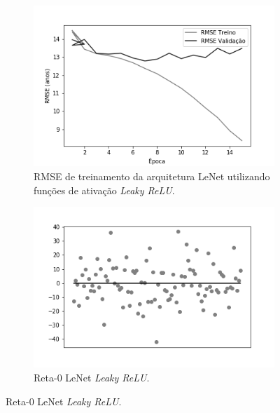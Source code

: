 \begin{figure}[hb!]
\begin{subfigure}[hb]{0.5\linewidth}
    \caption{RMSE de treinamento da arquitetura LeNet utilizando funções de ativação \emph{Leaky ReLU}.}
    \label{fig:redeneuralbiologica}
    \includegraphics[width=\linewidth]{img/graficos-fase2/fig-history-lenet-lrelu-data-augmentation-2-2.png}
  \end{subfigure}
	\begin{subfigure}[hb]{0.5\linewidth}
		\caption{Reta-0 LeNet \emph{Leaky ReLU}.}
		\label{fig:redeneuralbiologica}
	 \includegraphics[width=\linewidth]{img/graficos-fase2/fig-reta-0-lenetregressor-lrelu-data-augmentation-2-2.png}
	\end{subfigure}%
\end{figure}

